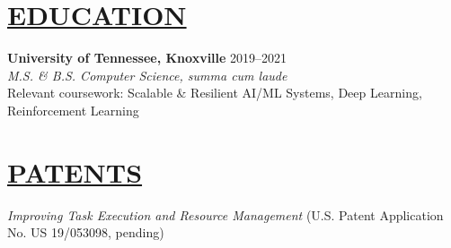 \documentclass[overlapped,line,11pt]{res}
\begin{document}
\begin{resume}
\section{\underline{EDUCATION}}

\textbf{University of Tennessee, Knoxville} \hfill 2019–2021 \\
{\sl M.S. \& B.S. Computer Science, summa cum laude} \\
Relevant coursework: Scalable \& Resilient AI/ML Systems, Deep Learning, Reinforcement Learning

\section{\underline{PATENTS}}
{\sl Improving Task Execution and Resource Management} (U.S. Patent Application No. US 19/053098, pending)

\end{resume}
\end{document}
